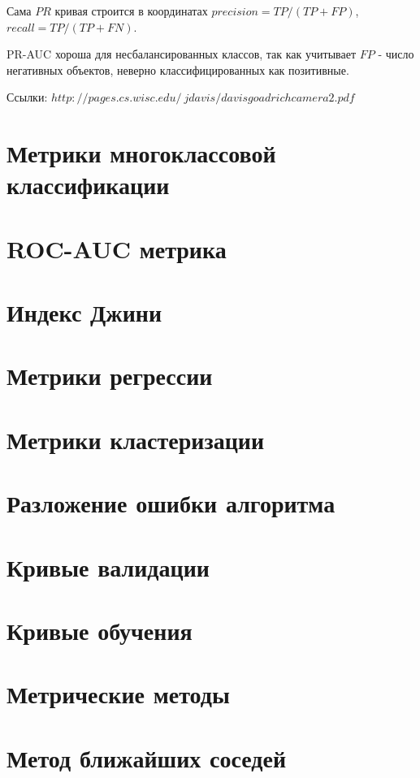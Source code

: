 Сама $PR$ кривая строится в координатах $precision = TP/(TP + FP)$, $recall = TP/(TP + FN)$.

PR-AUC хороша для несбалансированных классов, так как учитывает $FP$ - число негативных объектов, неверно классифицированных как позитивные.

Ссылки:
$http://pages.cs.wisc.edu/~jdavis/davisgoadrichcamera2.pdf$


\section{Метрики многоклассовой классификации}


\section{ROC-AUC метрика}


\section{Индекс Джини}


\section{Метрики регрессии}


\section{Метрики кластеризации}


\section{Разложение ошибки алгоритма}


\section{Кривые валидации}


\section{Кривые обучения}


\section{Метрические методы}


\section{Метод ближайших соседей}


